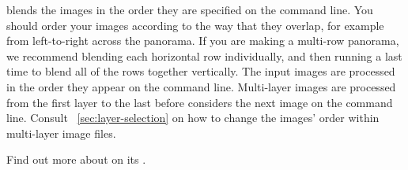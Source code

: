 \App{} blends the images in the order they are specified on the command line.  You should order
your images according to the way that they overlap, for example from left-to-right across the
panorama.  If you are making a multi-row panorama, we recommend blending each horizontal row
individually, and then running \App{} a last time to blend all of the rows together vertically.
The input images are processed in the order they appear on the command line.  Multi\hyp{}layer
images are processed from the first layer to the last before \App{} considers the next image on
the command line.  Consult \sectionName~\ref{sec:layer-selection} on how to change the images'
order within multi\hyp{}layer image files.

Find out more about \App{} on its 
.



